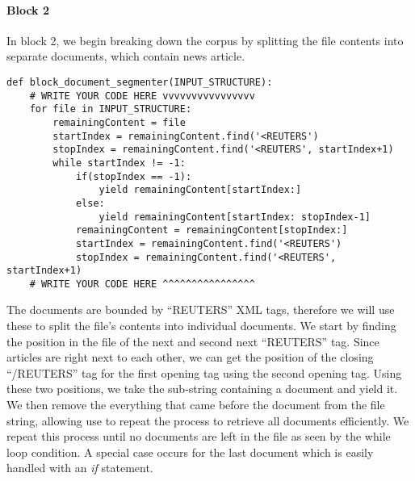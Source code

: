 \documentclass[]{report}
\begin{document}
\paragraph{Block 2}
In block 2, we begin breaking down the corpus by splitting the file contents into separate documents, which contain news article.
\begin{verbatim}
def block_document_segmenter(INPUT_STRUCTURE):
	# WRITE YOUR CODE HERE vvvvvvvvvvvvvvvv
	for file in INPUT_STRUCTURE:
		remainingContent = file
		startIndex = remainingContent.find('<REUTERS')
		stopIndex = remainingContent.find('<REUTERS', startIndex+1)
		while startIndex != -1:
			if(stopIndex == -1):
				yield remainingContent[startIndex:]
			else:
				yield remainingContent[startIndex: stopIndex-1]
			remainingContent = remainingContent[stopIndex:]
			startIndex = remainingContent.find('<REUTERS')
			stopIndex = remainingContent.find('<REUTERS', startIndex+1)
	# WRITE YOUR CODE HERE ^^^^^^^^^^^^^^^^
\end{verbatim}
The documents are bounded by ``\textlangle REUTERS\textrangle'' XML tags, therefore we will use these to split the file's contents into individual documents. We start by finding the position in the file of the next and second next ``\textlangle REUTERS\textrangle'' tag. Since articles are right next to each other, we can get the position of the closing ``\textlangle/REUTERS\textrangle'' tag for the first opening tag using the second opening tag. Using these two positions, we take the sub-string containing a document and yield it. We then remove the everything that came before the document from the file string, allowing use to repeat the process to retrieve all documents efficiently. We repeat this process until no documents are left in the file as seen by the while loop condition. A special case occurs for the last document which is easily handled with an \textit{if} statement.

\newpage
\end{document}
